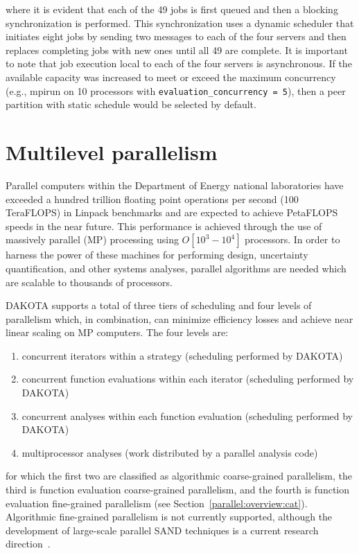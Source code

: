 where it is evident that each of the 49 jobs is first queued and then
a blocking synchronization is performed.  This synchronization uses a
dynamic scheduler that initiates eight jobs by sending two messages to
each of the four servers and then replaces completing jobs with new
ones until all 49 are complete.  It is important to note that job
execution local to each of the four servers is asynchronous.  If the
available capacity was increased to meet or exceed the maximum
concurrency (e.g., mpirun on 10 processors with
\texttt{evaluation\_concurrency = 5}), then a peer partition with
static schedule would be selected by default.


\section{Multilevel parallelism} \label{parallel:MLP}


Parallel computers within the Department of Energy national
laboratories have exceeded a hundred trillion floating point
operations per second (100 TeraFLOPS) in Linpack benchmarks and are
expected to achieve PetaFLOPS speeds in the near future. This
performance is achieved through the use of massively parallel (MP)
processing using $O[10^{3}-10^{4}]$ processors. In order to harness
the power of these machines for performing design, uncertainty
quantification, and other systems analyses, parallel algorithms are
needed which are scalable to thousands of processors.

DAKOTA supports a total of three tiers of scheduling and four levels
of parallelism which, in combination, can minimize efficiency losses
and achieve near linear scaling on MP computers. The four levels are:
\begin{enumerate}
\item concurrent iterators within a strategy (scheduling performed by
  DAKOTA)

\item concurrent function evaluations within each iterator (scheduling
  performed by DAKOTA)

\item concurrent analyses within each function evaluation (scheduling
  performed by DAKOTA)

\item multiprocessor analyses (work distributed by a parallel
  analysis code)
\end{enumerate}
for which the first two are classified as algorithmic coarse-grained
parallelism, the third is function evaluation coarse-grained
parallelism, and the fourth is function evaluation fine-grained
parallelism (see Section~\ref{parallel:overview:cat}). Algorithmic
fine-grained parallelism is not currently supported, although the
development of large-scale parallel SAND techniques is a current
research direction~\cite{Bar01b}.


